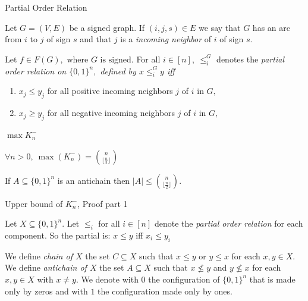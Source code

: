\documentclass{beamer}
\newcommand{\floor}[1]{\lfloor #1 \rfloor}
\begin{document}
\begin{frame}{Partial Order Relation}
    \justifying
    \begin{definition}
        \justifying
        Let $G=(V,E)$ be a signed graph. If $(i,j,s) \in E$ we say that $G$ has an arc from $i$ to $j$ of sign $s$ and that $j$ is a \textit{incoming neighbor} of $i$ of sign $s.$ 
    \end{definition}
    \begin{definition}
    Let $f \in F(G), \text{ where } G \text{ is signed.}$ For all $i \in [n],\ \leq_i^G$ denotes the \it partial order relation on $\{0,1\}^n,$ defined by $x \leq_i^G y$ iff
    \begin{enumerate}
        \item $x_j \leq y_j$ for all positive incoming neighbors $j$ of $i$ in $G,$
        \item $x_j \geq y_j$ for all negative incoming neighbors $j$ of $i$ in $G,$
    \end{enumerate}
    \end{definition}
\end{frame}

\begin{frame}{$\max{K_n^-}$}
\justifying
    \begin{theorem}
    $\forall n>0,\ \max(K_n^-) = \binom{n}{\floor{\frac{n}{2}}}$
    \end{theorem}
    
    \begin{lemma}[Sperner 1928]
    If $A \subseteq \{0,1\}^n$ is an antichain then $|A| \leq \binom{n}{\floor{\frac{n}{2}}}$.
    \end{lemma}
\end{frame}

\begin{frame}{Upper bound of $K_n^-$, Proof part 1}
\justifying
    \begin{block}
    \justifying
    Let $X \subseteq \{0, 1\}^n$. Let $\leq_i$ for all $i \in [n]$  denote the \textit{partial order relation} for each component. So the partial is:
        $x \leq y$ iff $x_i \leq y_i$
    
    We define \textit{chain of $X$} the set $C \subseteq X$ such that $x \leq y$ or $y \leq x$ for each $x, y \in X$.
    We define \textit{antichain of $X$} the set $A \subseteq X$ such that $x \nleq y$ and $y \nleq x$ for each $x, y \in X$ with $x \neq y$.
    We denote with $0$ the configuration of $\{0,1\}^n$ that is made only by zeros and with $1$ the configuration made only by ones.
    \end{block}
\end{frame}
\end{document}
